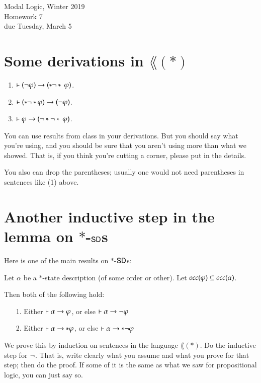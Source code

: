 \documentclass[12pt]{article}
\newcommand{\sw}{*}
\begin{document}
\begin{center}
{
\Large  Modal Logic, Winter 2019   \\
   Homework 7
\\
due Tuesday, March 5 \\
} 
\end{center}

\section{Some derivations in $\lang(\sw)$}

\begin{enumerate}
\item $\proves (\nott \phi) \iif (\sw\nott\sw\ \phi)$.
 
\item  $\proves (\sw\nott\sw \phi)\iif (\nott\phi)$.
\item  $\proves \phi \iif  (\nott \sw\nott\sw\ \phi)$.
\end{enumerate}
You can use results from class in your derivations.
But you should say what you're using, and you should be sure that you aren't using more than
what we showed.   That is, if you think you're cutting a corner, please put in the details.

You also can drop the parentheses; usually one would not need parentheses in sentences like (1) above.

\section{Another inductive step in the lemma on $\sw$-$\mbox{\sf SD}$s}
Here is one of the main 
results on  $\sw$-$\mbox{\sf SD}$s:

Let $\alpha$ be a $*$-state description (of some order or other).
Let $\mbox{\em occ}(\varphi) \subseteq\mbox{\em occ}(\alpha)$.

 


Then both of the following hold:
\begin{itemize}
\item[1.] Either $\vdash \alpha\rightarrow \varphi$, or else $\vdash \alpha\rightarrow \neg\varphi$
\item[2.] Either $\proves \alpha\iif \sw \phi$, or else $\proves \alpha\iif \sw\nott\phi$
\end{itemize}

We prove this by induction on sentences in the language $\lang(\sw)$.
Do the inductive step for $\neg$.   That is, write clearly what you assume and what you prove for that step;
then do the proof.   If some of it is the same as what we saw for propositional logic, you can just say so.
\end{document}
